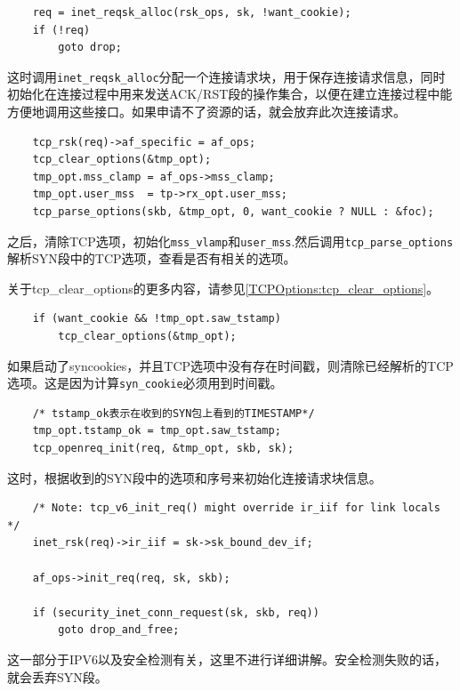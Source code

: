 \begin{verbatim}
    req = inet_reqsk_alloc(rsk_ops, sk, !want_cookie);
    if (!req)
        goto drop;
\end{verbatim}
            
        这时调用\texttt{inet_reqsk_alloc}分配一个连接请求块，用于保存连接请求信息，同时初始化在连接过程中用来发送ACK/RST段的操作集合，以便在建立连接过程中能方便地调用这些接口。如果申请不了资源的话，就会放弃此次连接请求。

\begin{verbatim}
    tcp_rsk(req)->af_specific = af_ops;
    tcp_clear_options(&tmp_opt);
    tmp_opt.mss_clamp = af_ops->mss_clamp;
    tmp_opt.user_mss  = tp->rx_opt.user_mss;
    tcp_parse_options(skb, &tmp_opt, 0, want_cookie ? NULL : &foc);
\end{verbatim}

        之后，清除TCP选项，初始化\texttt{mss_vlamp}和\texttt{user_mss}.然后调用\texttt{tcp_parse_options}解析SYN段中的TCP选项，查看是否有相关的选项。

        关于tcp\_clear\_options的更多内容，请参见\ref{TCPOptions:tcp_clear_options}。
\begin{verbatim}
    if (want_cookie && !tmp_opt.saw_tstamp)
        tcp_clear_options(&tmp_opt);
\end{verbatim}

        如果启动了syncookies，并且TCP选项中没有存在时间戳，则清除已经解析的TCP选项。这是因为计算\texttt{syn_cookie}必须用到时间戳。

\begin{verbatim}
    /* tstamp_ok表示在收到的SYN包上看到的TIMESTAMP*/
    tmp_opt.tstamp_ok = tmp_opt.saw_tstamp;        
    tcp_openreq_init(req, &tmp_opt, skb, sk);
\end{verbatim}

        这时，根据收到的SYN段中的选项和序号来初始化连接请求块信息。

\begin{verbatim}
    /* Note: tcp_v6_init_req() might override ir_iif for link locals */
    inet_rsk(req)->ir_iif = sk->sk_bound_dev_if;

    af_ops->init_req(req, sk, skb);

    if (security_inet_conn_request(sk, skb, req))
        goto drop_and_free;
\end{verbatim}

        这一部分于IPV6以及安全检测有关，这里不进行详细讲解。安全检测失败的话，就会丢弃SYN段。

